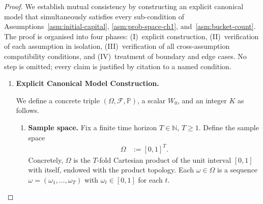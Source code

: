 \documentclass[12pt,openany]{book}
\newcommand{\calF}{\mathcal{F}}
\newcommand{\Prob}{\mathbb{P}}
\numberwithin{equation}{chapter}
\theoremstyle{plain}
\theoremstyle{definition}
\theoremstyle{remark}
\numberwithin{equation}{chapter}
\theoremstyle{plain}
\begin{document}
\begin{proof}
We establish mutual consistency by constructing an explicit canonical
model that simultaneously satisfies every sub-condition of
Assumptions~\ref{asm:initial-capital}, \ref{asm:prob-space-ch1},
and~\ref{asm:bucket-count}.  The proof is organised into four
phases: (I)~explicit construction, (II)~verification of each
assumption in isolation, (III)~verification of all cross-assumption
compatibility conditions, and (IV)~treatment of boundary and edge
cases.  No step is omitted; every claim is justified by citation to
a named condition.

\begin{enumerate}[label=\textbf{Phase~\Roman*.}]

\item \textbf{Explicit Canonical Model Construction.}

We define a concrete triple $(\Omega, \calF, \Prob)$, a scalar
$W_0$, and an integer $K$ as follows.

\begin{enumerate}[label=\textbf{Step~1.\arabic*.}]

  \item \textbf{Sample space.}
        Fix a finite time horizon $T \in \mathbb{N}$, $T \geq 1$.
        Define the sample space
        \begin{align}
          \Omega &:= [0,1]^{T}.
          \label{eq:cons-omega}
        \end{align}
        Concretely, $\Omega$ is the $T$-fold Cartesian product of
        the unit interval $[0,1]$ with itself, endowed with the
        product topology.  Each $\omega \in \Omega$ is a sequence
        $\omega = (\omega_1, \ldots, \omega_T)$ with
        $\omega_t \in [0,1]$ for each $t$.


\end{enumerate}
\end{enumerate}
\end{proof}
\end{document}
